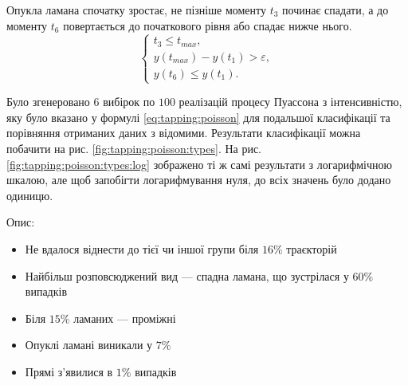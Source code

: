 Опукла ламана спочатку зростає, не пізніше моменту $t_3$ починає спадати,
а до моменту $t_6$ повертається до початкового рівня або спадає нижче нього.
\begin{equation*}
  \begin{cases}
    t_3 \le t_{max}, \\
    y\left( t_{max} \right) - y\left( t_1\right) > \varepsilon, \\
    y\left( t_6 \right) \le y\left( t_1 \right).
  \end{cases}
\end{equation*}

Було згенеровано $6$ вибірок по $100$ реалізацій процесу Пуассона з
інтенсивністю, яку було вказано у формулі \eqref{eq:tapping:poisson} для
подальшої класифікації та порівняння отриманих даних з відомими.
Результати класифікації можна побачити на рис. \ref{fig:tapping:poisson:types}.
На рис. \ref{fig:tapping:poisson:types:log} зображено ті ж самі результати з
логарифмічною шкалою, але щоб запобігти логарифмування нуля, до всіх значень
було додано одиницю.

Опис:
\begin{itemize}
  \item
    Не вдалося віднести до тієї чи іншої групи біля $16\%$ траєкторій
  \item
    Найбільш розповсюджений вид --- спадна ламана, що зустрілася у $60\%$
    випадків
  \item
    Біля $15\%$ ламаних --- проміжні
  \item
    Опуклі ламані виникали у $7\%$
  \item
    Прямі з’явилися в $1\%$ випадків
\end{itemize}


